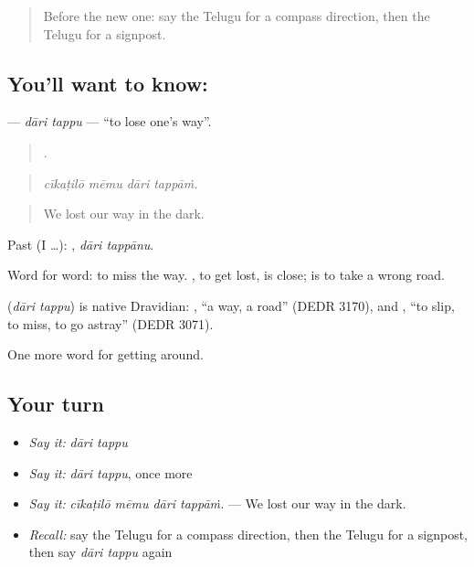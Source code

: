 \label{lesson:TE-C448-dari-tappu}



\begin{quote}
Before the new one: say the Telugu for a compass direction, then the Telugu for a signpost.
\end{quote}

\subsection*{You'll want to know:  }
\textbf{ } — \emph{dāri tappu} — \textquotedblleft{}to lose one's way\textquotedblright{}.

\begin{quote}
   .
\end{quote}

\begin{quote}
\emph{cīkaṭilō mēmu dāri tappāṁ.}
\end{quote}

\begin{quote}
We lost our way in the dark.
\end{quote}

Past (I …):  , \emph{dāri tappānu}.

Word for word: to miss the way. , to get lost, is close;   is to take a wrong road.

\begin{cousinweb}
\textbf{ } (\emph{dāri tappu}) is native Dravidian: , \textquotedblleft{}a way, a road\textquotedblright{} (DEDR 3170), and , \textquotedblleft{}to slip, to miss, to go astray\textquotedblright{} (DEDR 3071).
\end{cousinweb}

\begin{grammarlens}[title={What you've built}]
One more word for getting around.
\end{grammarlens}

\subsection*{Your turn}
\begin{itemize}
\raggedright
  \item \emph{Say it:} \emph{dāri tappu}
  \item \emph{Say it:} \emph{dāri tappu}, once more
  \item \emph{Say it:} \emph{cīkaṭilō mēmu dāri tappāṁ.} — We lost our way in the dark.
  \item \emph{Recall:} say the Telugu for a compass direction, then the Telugu for a signpost, then say \emph{dāri tappu} again
\end{itemize}

